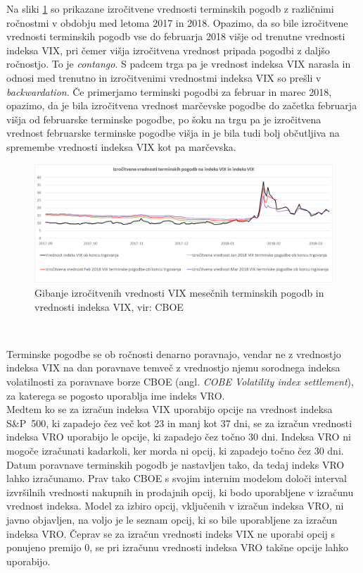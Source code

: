 \documentclass[12pt,a4paper, reqno]{amsart}
\theoremstyle{definition} %
\theoremstyle{plain} %
\begin{document}
Na sliki \ref{Graf 6} so prikazane izročitvene vrednosti terminskih pogodb z različnimi ro\-čno\-stmi v obdobju med letoma 2017 in 2018. Opazimo, da so bile izročitvene vrednosti terminskih pogodb vse do februarja 2018 višje od trenutne vrednosti indeksa VIX, pri čemer višja izročitvena vrednost pripada pogodbi z daljšo ročnostjo. To je \textit{contango}. S padcem trga pa je vrednost indeksa VIX narasla in odnosi med trenutno in izročitvenimi vrednostmi indeksa VIX so prešli v \textit{backwardation}. Če primerjamo terminski pogodbi za februar in marec 2018, opazimo, da je bila izročitvena vrednost marčevske pogodbe do začetka februarja višja od februarske terminske pogodbe, po šoku na trgu pa je izročitvena vrednost februarske terminske pogodbe višja in je bila tudi bolj občutljiva na spremembe vrednosti indeksa VIX kot pa marčevska.
\begin{figure}[!h]
\centering
\includegraphics[width = 15 cm]{Grafi/VIX_futures_2018.png}
\caption{Gibanje izročitvenih vrednosti VIX mesečnih terminskih pogodb in vrednosti indeksa VIX, vir: CBOE}
\label{Graf 6}
\end{figure}\



Terminske pogodbe se ob ročnosti denarno poravnajo, vendar ne z vrednostjo indeksa VIX na dan poravnave temveč z vrednostjo njemu sorodnega indeksa volatilnosti za poravnave borze CBOE (angl. \textit{COBE Volatility index settlement}), za katerega se pogosto uporablja ime indeks VRO.\\

Medtem ko se za izračun indeksa VIX uporabijo opcije na vrednost indeksa S\&P~500, ki zapadejo čez več kot 23 in manj kot 37 dni, se za izračun vrednosti indeksa VRO uporabijo le opcije, ki zapadejo čez točno 30 dni. Indeksa VRO ni mogoče izračunati kadarkoli, ker morda ni opcij, ki zapadejo točno čez 30 dni. Datum poravnave terminskih pogodb je nastavljen tako, da tedaj indeks VRO lahko izračunamo.  Prav tako CBOE s svojim internim modelom določi interval izvršilnih vrednosti nakupnih in prodajnih opcij, ki bodo uporabljene v izračunu vrednost indeksa. Model za izbiro opcij, vključenih v izračun indeksa VRO, ni javno objavljen, na voljo je le seznam opcij, ki so bile uporabljene za izračun indeksa VRO. Čeprav se za izračun vrednosti indeks VIX ne uporabi opcij s ponujeno premijo 0, se pri izračunu vrednosti indeksa VRO takšne opcije lahko uporabijo.\\
\end{document}
